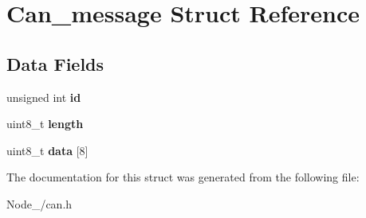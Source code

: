 \hypertarget{structCan__message}{}\section{Can\+\_\+message Struct Reference}
\label{structCan__message}
\subsection*{Data Fields}
\begin{DoxyCompactItemize}
\item 
unsigned int {\bfseries id}\hypertarget{structCan__message_a01173197b55ae89a2986160973678cdd}{}\label{structCan__message_a01173197b55ae89a2986160973678cdd}

\item 
uint8\+\_\+t {\bfseries length}\hypertarget{structCan__message_aefbc8bed81932a7c02ad6067260a9c16}{}\label{structCan__message_aefbc8bed81932a7c02ad6067260a9c16}

\item 
uint8\+\_\+t {\bfseries data} \mbox{[}8\mbox{]}\hypertarget{structCan__message_a68c0d77e53fd39eb705238ae9dd986a4}{}\label{structCan__message_a68c0d77e53fd39eb705238ae9dd986a4}

\end{DoxyCompactItemize}


The documentation for this struct was generated from the following file\+:\begin{DoxyCompactItemize}
\item 
Node\+\_/can.\+h\end{DoxyCompactItemize}
